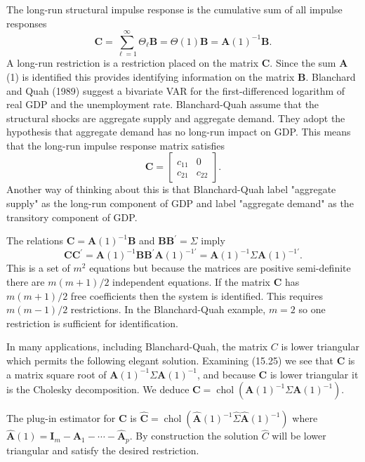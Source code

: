 \documentclass[10pt]{article}
\begin{document}
The long-run structural impulse response is the cumulative sum of all impulse responses
$$
\boldsymbol{C}=\sum_{\ell=1}^{\infty} \Theta_{\ell} \boldsymbol{B}=\Theta(1) \boldsymbol{B}=\boldsymbol{A}(1)^{-1} \boldsymbol{B} .
$$
A long-run restriction is a restriction placed on the matrix $\boldsymbol{C}$. Since the sum $\boldsymbol{A}$ (1) is identified this provides identifying information on the matrix $\boldsymbol{B}$. Blanchard and Quah (1989) suggest a bivariate VAR for the first-differenced logarithm of real GDP and the unemployment rate. Blanchard-Quah assume that the structural shocks are aggregate supply and aggregate demand. They adopt the hypothesis that aggregate demand has no long-run impact on GDP. This means that the long-run impulse response matrix satisfies
$$
\boldsymbol{C}=\left[\begin{array}{cc}
c_{11} & 0 \\
c_{21} & c_{22}
\end{array}\right] .
$$
Another way of thinking about this is that Blanchard-Quah label "aggregate supply" as the long-run component of GDP and label "aggregate demand" as the transitory component of GDP.

The relations $\boldsymbol{C}=\boldsymbol{A}(1)^{-1} \boldsymbol{B}$ and $\boldsymbol{B} \boldsymbol{B}^{\prime}=\Sigma$ imply
$$
\boldsymbol{C} \boldsymbol{C}^{\prime}=\boldsymbol{A}(1)^{-1} \boldsymbol{B} \boldsymbol{B}^{\prime} \boldsymbol{A}(1)^{-1 \prime}=\boldsymbol{A}(1)^{-1} \Sigma \boldsymbol{A}(1)^{-1 \prime} .
$$
This is a set of $m^{2}$ equations but because the matrices are positive semi-definite there are $m(m+1) / 2$ independent equations. If the matrix $\boldsymbol{C}$ has $m(m+1) / 2$ free coefficients then the system is identified. This requires $m(m-1) / 2$ restrictions. In the Blanchard-Quah example, $m=2$ so one restriction is sufficient for identification.

In many applications, including Blanchard-Quah, the matrix $C$ is lower triangular which permits the following elegant solution. Examining (15.25) we see that $\boldsymbol{C}$ is a matrix square root of $\boldsymbol{A}(1)^{-1} \Sigma \boldsymbol{A}(1)^{-1}$, and because $\boldsymbol{C}$ is lower triangular it is the Cholesky decomposition. We deduce $\boldsymbol{C}=\operatorname{chol}\left(\boldsymbol{A}(1)^{-1} \Sigma \boldsymbol{A}(1)^{-1}\right)$.

The plug-in estimator for $\boldsymbol{C}$ is $\widehat{\boldsymbol{C}}=\operatorname{chol}\left(\widehat{\boldsymbol{A}}(1)^{-1} \widehat{\Sigma} \widehat{\boldsymbol{A}}(1)^{-1}\right)$ where $\widehat{\boldsymbol{A}}(1)=\boldsymbol{I}_{m}-\widehat{\boldsymbol{A}}_{1}-\cdots-\widehat{\boldsymbol{A}}_{p}$. By construction the solution $\widehat{C}$ will be lower triangular and satisfy the desired restriction.
\end{document}
